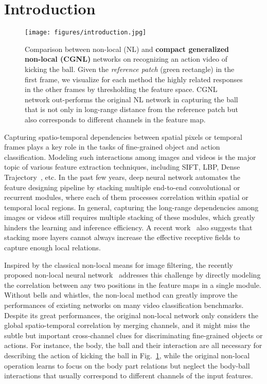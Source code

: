 \documentclass{article}
\begin{document}
\section{Introduction}
%
%
\begin{figure}[ht]
  \centering
  \texttt{[image: figures/introduction.jpg]}
  \caption{\small{
    Comparison between non-local (NL) and \textbf{compact generalized non-local (CGNL)} networks on recognizing an action video of kicking the ball.
    Given the \emph{reference patch} (green rectangle) in the first frame, we visualize for each method the highly related responses in the other frames by thresholding the feature space.
    CGNL network out-performs the original NL network in capturing the ball that is not only in long-range distance from the reference patch but also corresponds to different channels in the feature map.
  }}
\label{fig:introduction}
\end{figure}
%
%
Capturing spatio-temporal dependencies between spatial pixels or temporal frames plays a key role in the tasks of fine-grained object and action classification.
Modeling such interactions among images and videos is the major topic of various feature extraction techniques, including SIFT, LBP, Dense Trajectory~\cite{dense_trajectories}, etc.
In the past few years, deep neural network automates the feature designing pipeline by stacking multiple end-to-end convolutional or recurrent modules, where each of them processes correlation within spatial or temporal local regions.
In general, capturing the long-range dependencies among images or videos still requires multiple stacking of these modules, which greatly hinders the learning and inference efficiency.
A recent work~\cite{understanding_receptive_field} also suggests that stacking more layers cannot always increase the effective receptive fields to capture enough local relations.

Inspired by the classical non-local means for image filtering, the recently proposed non-local neural network~\cite{non-local} addresses this challenge by directly modeling the correlation between any two positions in the feature maps in a single module.
Without bells and whistles, the non-local method can greatly improve the performances of existing networks on many video classification benchmarks.
Despite its great performances, the original non-local network only considers the global spatio-temporal correlation by merging channels, and it might miss the subtle but important cross-channel clues for discriminating fine-grained objects or actions.
For instance, the body, the ball and their interaction are all necessary for describing the action of kicking the ball in Fig.~\ref{fig:introduction}, while the original non-local operation learns to focus on the body part relations but neglect the body-ball interactions that usually correspond to different channels of the input features.
\end{document}
